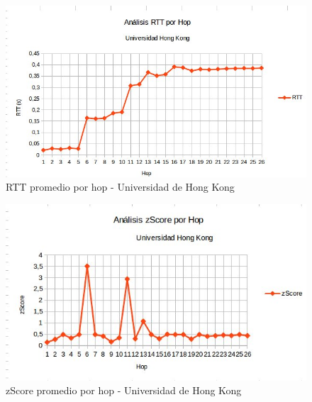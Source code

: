 

\begin{figure}[H]
\centering
\includegraphics[width=1\textwidth]{graficos/rTT_HongKong.jpg}
\caption{RTT promedio por hop - Universidad de Hong Kong}
\label{hongkong_rtt}
\end{figure}

\begin{figure}[H]
\centering
\includegraphics[width=1\textwidth]{graficos/zScore_HongKong.jpg}
\caption{zScore promedio por hop - Universidad de Hong Kong}
\label{hongkong_zs}
\end{figure}
